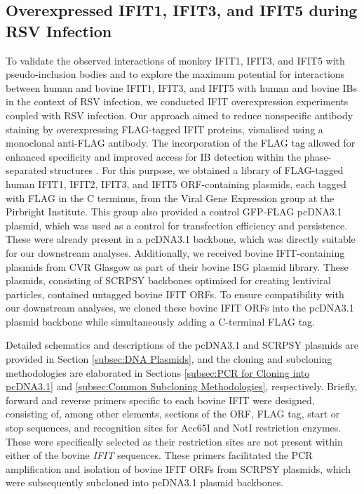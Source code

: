 \subsection{Overexpressed IFIT1, IFIT3, and IFIT5 during RSV Infection} \label{subsec:Overexpressed IFIT1, IFIT3, and IFIT5 During RSV Infection}
To validate the observed interactions of monkey IFIT1, IFIT3, and IFIT5 with pseudo-inclusion bodies and to explore the maximum potential for interactions between human and bovine IFIT1, IFIT3, and IFIT5 with human and bovine IBs in the context of RSV infection, we conducted IFIT overexpression experiments coupled with RSV infection. Our approach aimed to reduce nonspecific antibody staining by overexpressing FLAG-tagged IFIT proteins, visualised using a monoclonal anti-FLAG antibody. The incorporation of the FLAG tag allowed for enhanced specificity and improved access for IB detection within the phase-separated structures \cite{Munro1984Use70.}. For this purpose, we obtained a library of FLAG-tagged human IFIT1, IFIT2, IFIT3, and IFIT5 ORF-containing plasmids, each tagged with FLAG in the C terminus, from the Viral Gene Expression group at the Pirbright Institute. This group also provided a control GFP-FLAG pcDNA3.1 plasmid, which was used as a control for transfection efficiency and persistence. These were already present in a pcDNA3.1 backbone, which was directly suitable for our downstream analyses. Additionally, we received bovine IFIT-containing plasmids from CVR Glasgow as part of their bovine ISG plasmid library. These plasmids, consisting of SCRPSY backbones optimised for creating lentiviral particles, contained untagged bovine IFIT ORFs. To ensure compatibility with our downstream analyses, we cloned these bovine IFIT ORFs into the pcDNA3.1 plasmid backbone while simultaneously adding a C-terminal FLAG tag.

Detailed schematics and descriptions of the pcDNA3.1 and SCRPSY plasmids are provided in Section \ref{subsec:DNA Plasmids}, and the cloning and subcloning methodologies are elaborated in Sections \ref{subsec:PCR for Cloning into pcDNA3.1} and \ref{subsec:Common Subcloning Methodologies}, respectively. Briefly, forward and reverse primers specific to each bovine IFIT were designed, consisting of, among other elements, sections of the ORF, FLAG tag, start or stop sequences, and recognition sites for Acc65I and NotI restriction enzymes. These were specifically selected as their restriction sites are not present within either of the bovine \textit{IFIT} sequences. These primers facilitated the PCR amplification and isolation of bovine IFIT ORFs from SCRPSY plasmids, which were subsequently subcloned into pcDNA3.1 plasmid backbones.

